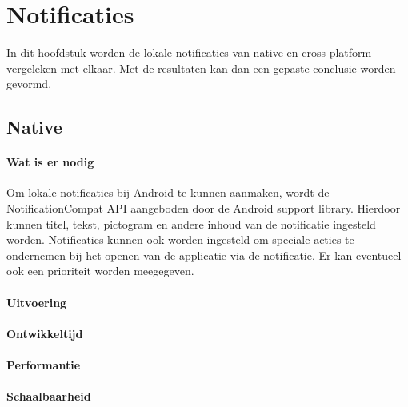 
\chapter{Notificaties}%
\label{ch:notificaties}

In dit hoofdstuk worden de lokale notificaties van native en cross-platform vergeleken met elkaar. 
Met de resultaten kan dan een gepaste conclusie worden gevormd.

\section{Native}
\subsubsection{Wat is er nodig}
Om lokale notificaties bij Android te kunnen aanmaken, wordt de NotificationCompat API aangeboden 
door de Android support library. Hierdoor kunnen titel, tekst, pictogram en andere inhoud van de 
notificatie ingesteld worden. Notificaties kunnen ook worden ingesteld om speciale acties te ondernemen bij het openen 
van de applicatie via de notificatie. Er kan eventueel ook een prioriteit worden meegegeven.

\subsubsection{Uitvoering}



\subsubsection{Ontwikkeltijd}



\subsubsection{Performantie}



\subsubsection{Schaalbaarheid}


